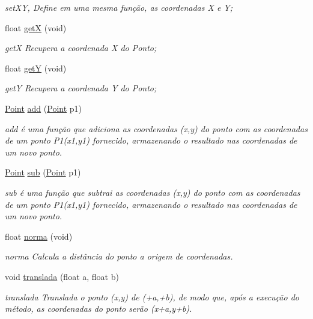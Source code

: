 \begin{DoxyCompactItemize}
\begin{DoxyCompactList}\small\item\em set\+XY, Define em uma mesma função, as coordenadas X e Y; \end{DoxyCompactList}\item 
float \mbox{\hyperlink{class_point_a9aa94b8fd07296e64d304ef3750db113}{getX}} (void)
\begin{DoxyCompactList}\small\item\em getX Recupera a coordenada X do Ponto; \end{DoxyCompactList}\item 
float \mbox{\hyperlink{class_point_a2444daa96871c89614510bc4bfcd19ce}{getY}} (void)
\begin{DoxyCompactList}\small\item\em getY Recupera a coordenada Y do Ponto; \end{DoxyCompactList}\item 
\mbox{\hyperlink{class_point}{Point}} \mbox{\hyperlink{class_point_a9dbea84b07b0a8ec3bbb9e58b3d15899}{add}} (\mbox{\hyperlink{class_point}{Point}} p1)
\begin{DoxyCompactList}\small\item\em add é uma função que adiciona as coordenadas (x,y) do ponto com as coordenadas de um ponto P1(x1,y1) fornecido, armazenando o resultado nas coordenadas de um novo ponto. \end{DoxyCompactList}\item 
\mbox{\hyperlink{class_point}{Point}} \mbox{\hyperlink{class_point_a9cf2c53b0a4e6282a6712824bb4e9b00}{sub}} (\mbox{\hyperlink{class_point}{Point}} p1)
\begin{DoxyCompactList}\small\item\em sub é uma função que subtrai as coordenadas (x,y) do ponto com as coordenadas de um ponto P1(x1,y1) fornecido, armazenando o resultado nas coordenadas de um novo ponto. \end{DoxyCompactList}\item 
float \mbox{\hyperlink{class_point_aa3005a9d97e2cb05624414973a214788}{norma}} (void)
\begin{DoxyCompactList}\small\item\em norma Calcula a distância do ponto a origem de coordenadas. \end{DoxyCompactList}\item 
void \mbox{\hyperlink{class_point_ad9676e36f3444534b609e3c68422239a}{translada}} (float a, float b)
\begin{DoxyCompactList}\small\item\em translada Translada o ponto (x,y) de (+a,+b), de modo que, após a execução do método, as coordenadas do ponto serão (x+a,y+b). \end{DoxyCompactList}\item 

\end{DoxyCompactItemize}
